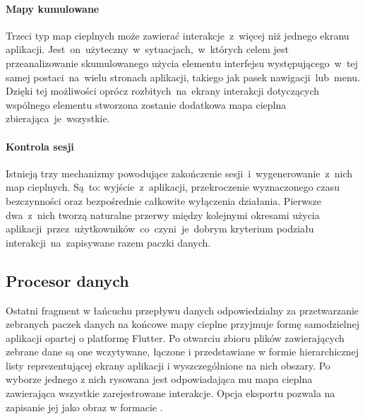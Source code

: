 
\paragraph{Mapy kumulowane} Trzeci typ map cieplnych może zawierać interakcje~z~więcej niż jednego ekranu aplikacji. Jest~on~użyteczny~w~sytuacjach,~w~których celem jest przeanalizowanie skumulowanego użycia elementu interfejsu występującego~w~tej samej postaci~na~wielu stronach aplikacji, takiego jak pasek nawigacji~lub~menu. Dzięki tej możliwości oprócz rozbitych~na~ekrany interakcji dotyczących wspólnego elementu stworzona zostanie dodatkowa mapa cieplna zbierająca~je~wszystkie.


\paragraph{Kontrola sesji}
Istnieją trzy mechanizmy powodujące zakończenie sesji~i~wygenerowanie~z~nich map cieplnych. Są~to: wyjście~z~aplikacji, przekroczenie wyznaczonego czasu bezczynności oraz bezpośrednie całkowite wyłączenia działania. Pierwsze dwa~z~nich tworzą naturalne przerwy między kolejnymi okresami użycia aplikacji~przez~użytkowników~co~czyni~je~dobrym kryterium podziału interakcji~na~zapisywane razem paczki danych.

\newcommand*\circled[1]{\tikz[baseline=(char.base)]{\node[shape=circle,draw,inner sep=1.2pt] (char) {#1};}}

\subsection{Procesor danych}
Ostatni fragment w łańcuchu przepływu danych odpowiedzialny za przetwarzanie zebranych paczek danych na końcowe mapy cieplne przyjmuje formę samodzielnej aplikacji opartej o platformę Flutter. Po otwarciu zbioru plików zawierających zebrane dane są one wczytywane, łączone i przedstawiane w formie hierarchicznej listy reprezentującej ekrany aplikacji i wyszczególnione na nich obszary. Po wyborze jednego z nich rysowana jest odpowiadająca mu mapa cieplna zawierająca wszystkie zarejestrowane interakcje. Opcja eksportu pozwala na zapisanie jej jako obraz w formacie .


